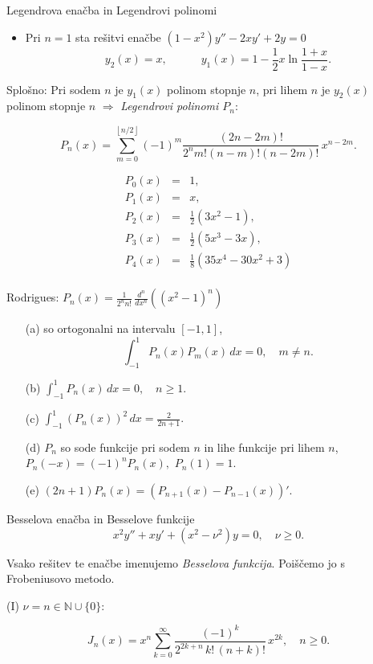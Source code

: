 \documentclass[a4paper,10pt]{article}
\begin{document}
\begin{multicols}{2}
\begin{formulaBox}{Legendrova enačba in Legendrovi polinomi}
\begin{itemize}
  \item Pri $n=1$ sta rešitvi enačbe  $(1-x^2)y''-2xy'+2y=0$  
  $$y_2(x)=x,\quad\qquad y_1(x)=1-\frac{1}{2} x \ln \frac{1+x}{1-x}.$$
\end{itemize}

Splošno:  Pri sodem $n$ je  $y_1(x)$ polinom stopnje $n$, pri lihem $n$ je $y_2(x)$ polinom stopnje $n$ $\Rightarrow$ \emph{Legendrovi polinomi $P_n$}:

	$$P_n(x)=\sum_{m=0}^{\left\lfloor n/2\right\rfloor}(-1)^m \frac{(2n-2m)!}{2^n m! (n-m)!(n-2m)!}\, x^{n-2m}.$$

\begin{eqnarray*}	
P_0(x)&=& 1,\\
P_1(x)&=& x,\\
P_2(x)&=& \frac{1}{2}(3x^2-1),\\
P_3(x)&=& \frac{1}{2}(5x^3-3x) ,\\
P_4(x)&=& \frac{1}{8}(35x^4-30x^2+3)\\
\end{eqnarray*}	


\medskip
Rodrigues:	$P_n(x)=\frac{1}{2^n n!}\,\frac{d^n}{d x^n}\left( (x^2-1)^n\right)$
		\begin{itemize}
			\item[(a)] so ortogonalni na intervalu $\left[-1,1\right]$,  %
			$$	\int_{-1}^1 P_n(x)P_m(x)\,dx=0,\quad m\ne n.$$
			\item[(b)] $\displaystyle	\int_{-1}^1 P_n(x)\,dx=0,\quad n\ge 1.$
			\item[(c)] 
			$\displaystyle
			\int_{-1}^1 \left(P_n(x)\right)^2\,dx=\frac{2}{2n+1}.\label{leg:norma}
			$
			\item[(d)] $P_n$ so sode funkcije pri sodem $n$ in lihe funkcije pri lihem $n$, $P_n(-x)=(-1)^n P_n(x),$  $P_n(1)=1$.
			
			\item[(e)] $(2n+1)P_n(x)=\left( P_{n+1}(x)-P_{n-1}(x)\right)'.$
		\end{itemize}
\end{formulaBox}

\begin{formulaBox}{Besselova enačba in Besselove funkcije}
	$$	x^2y''+xy'+(x^2-\nu ^2)y=0,\quad \nu\ge 0.$$

Vsako rešitev te enačbe imenujemo \emph{Besselova funkcija}. Poiščemo jo s Frobeniusovo metodo.

(I) $\nu=n\in\mathbb{N}\cup \{0\}$:

	$$
		J_n(x)=x^n \sum_{k=0}^\infty \frac{(-1)^k }{2^{2k+n}\,k!\,(n+k)!}\, x^{2k},\quad n\ge 0.
	$$



\end{formulaBox}
\end{multicols}
\end{document}
